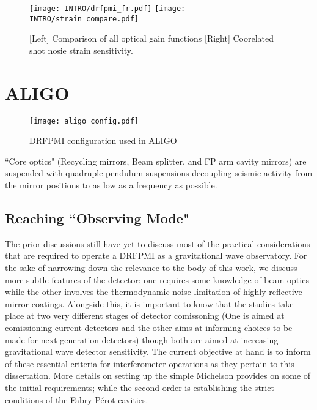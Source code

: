 {\begin{figure}[H]
  \begin{subcaptiongroup}
	  \texttt{[image: INTRO/drfpmi\_fr.pdf]}
 	  \texttt{[image: INTRO/strain\_compare.pdf]}
  \end{subcaptiongroup}
  \hfill
  \caption{[Left] Comparison of all optical gain functions [Right] Coorelated shot nosie strain sensitivity.}
  \label{fig:drfpmi_gain_and_strain}
\end{figure}

\section{ALIGO}

\begin{figure}[H]
  \begin{center}
	  \texttt{[image: aligo\_config.pdf]}
  \end{center}
  \caption{DRFPMI configuration used in ALIGO}
  \label{fig:simple_michelson}
\end{figure}

``Core optics" (Recycling mirrors, Beam splitter, and FP arm cavity mirrors) are suspended with quadruple pendulum suspensions decoupling seismic activity from the mirror positions to as low as a frequency as possible. 

\subsection{Reaching ``Observing Mode"}
The prior discussions still have yet to discuss most of the practical considerations that are required to operate a DRFPMI as a gravitational wave observatory. For the sake of narrowing down the relevance to the body of this work, we discuss more subtle features of the detector: one requires some knowledge of beam optics while the other involves the thermodynamic noise limitation of highly reflective mirror coatings. Alongside this, it is important to know that the studies take place at two very different stages of detector comissoning (One is aimed at comissioning current detectors and the other aims at informing choices to be made for next generation detectors) though both are aimed at increasing gravitational wave detector sensitivity.  The current objective at hand is to inform of these essential criteria for interferometer operations as they pertain to this dissertation. More details on setting up the simple Michelson provides on some of the initial requirements; while the second order is establishing the strict conditions of the Fabry-P\'{e}rot cavities.


}
